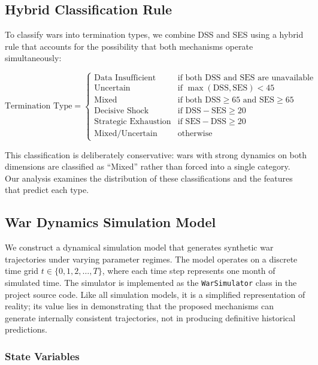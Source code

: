 \subsection{Hybrid Classification Rule}

To classify wars into termination types, we combine DSS and SES using a hybrid rule that accounts for the possibility that both mechanisms operate simultaneously:

\begin{equation}
\text{Termination Type} = \begin{cases}
    \text{Data Insufficient} & \text{if both DSS and SES are unavailable} \\
    \text{Uncertain} & \text{if } \max(\text{DSS}, \text{SES}) < 45 \\
    \text{Mixed} & \text{if both DSS} \geq 65 \text{ and SES} \geq 65 \\
    \text{Decisive Shock} & \text{if } \text{DSS} - \text{SES} \geq 20 \\
    \text{Strategic Exhaustion} & \text{if } \text{SES} - \text{DSS} \geq 20 \\
    \text{Mixed/Uncertain} & \text{otherwise}
\end{cases}
\label{eq:hybrid}
\end{equation}

This classification is deliberately conservative: wars with strong dynamics on both dimensions are classified as ``Mixed'' rather than forced into a single category. Our analysis examines the distribution of these classifications and the features that predict each type.

\subsection{War Dynamics Simulation Model}\label{sec:simulation}

We construct a dynamical simulation model that generates synthetic war trajectories under varying parameter regimes. The model operates on a discrete time grid $t \in \{0, 1, 2, \ldots, T\}$, where each time step represents one month of simulated time. The simulator is implemented as the \texttt{WarSimulator} class in the project source code. Like all simulation models, it is a simplified representation of reality; its value lies in demonstrating that the proposed mechanisms can generate internally consistent trajectories, not in producing definitive historical predictions.

\subsubsection{State Variables}

